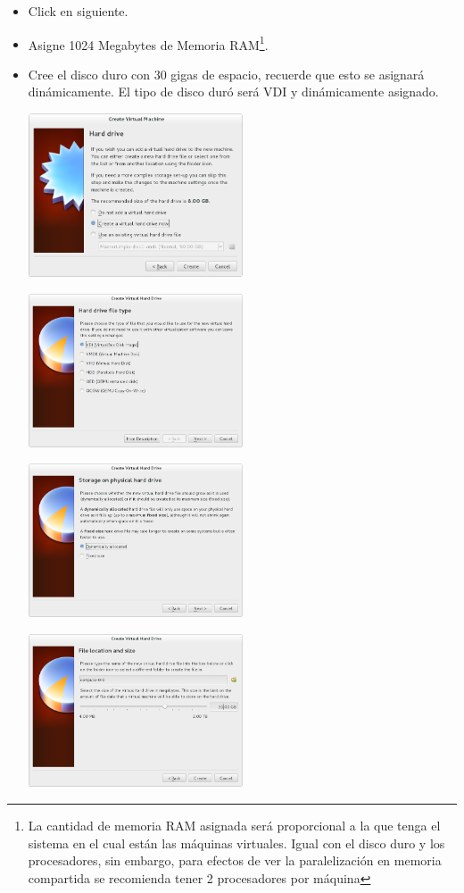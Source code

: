 \begin{enumerate}
\begin{itemize}
	\item Click en siguiente.

	\item Asigne 1024 Megabytes de Memoria RAM\footnote{La cantidad de memoria RAM asignada será proporcional a la que tenga el sistema en el cual están las máquinas virtuales. Igual con el disco duro y los procesadores, sin embargo, para efectos de ver la paralelización en memoria compartida se recomienda tener 2 procesadores por máquina}.

	\item Cree el disco duro con 30 gigas de espacio, recuerde que esto se asignará dinámicamente. El tipo de disco duró será VDI y dinámicamente asignado.



	\includegraphics[width=0.5\textwidth]{aux/nodohd}

	
	\includegraphics[width=0.5\textwidth]{aux/nododvi}


	\includegraphics[width=0.5\textwidth]{aux/hddinamico}


	\includegraphics[width=0.5\textwidth]{aux/nodohdsize}
	


\end{itemize}
\end{enumerate}
